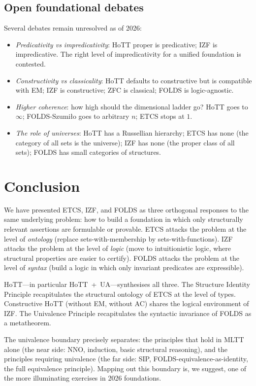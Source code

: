 \documentclass[12pt]{article}
\theoremstyle{definition}
\theoremstyle{remark}
\begin{document}
\subsection{Open foundational debates}

Several debates remain unresolved as of 2026:
\begin{itemize}
\item \emph{Predicativity vs impredicativity}: HoTT proper is predicative; IZF is
impredicative. The right level of impredicativity for a unified foundation is contested.
\item \emph{Constructivity vs classicality}: HoTT defaults to constructive but is
compatible with EM; IZF is constructive; ZFC is classical; FOLDS is logic-agnostic.
\item \emph{Higher coherence}: how high should the dimensional ladder go? HoTT goes to
$\infty$; FOLDS-Szumi\l{}o goes to arbitrary $n$; ETCS stops at $1$.
\item \emph{The role of universes}: HoTT has a Russellian hierarchy; ETCS has none
(the category of all sets is the universe); IZF has none (the proper class of all sets);
FOLDS has small categories of structures.
\end{itemize}

\section{Conclusion}
\label{sec:conclusion}

We have presented ETCS, IZF, and FOLDS as three orthogonal responses to the same
underlying problem: how to build a foundation in which only structurally relevant
assertions are formulable or provable. ETCS attacks the problem at the level of
\emph{ontology} (replace sets-with-membership by sets-with-functions). IZF attacks the
problem at the level of \emph{logic} (move to intuitionistic logic, where structural
properties are easier to certify). FOLDS attacks the problem at the level of
\emph{syntax} (build a logic in which only invariant predicates are expressible).

HoTT---in particular HoTT~+~UA---synthesises all three. The Structure Identity Principle
recapitulates the structural ontology of ETCS at the level of types. Constructive HoTT
(without EM, without AC) shares the logical environment of IZF. The Univalence Principle
recapitulates the syntactic invariance of FOLDS as a metatheorem.

The univalence boundary precisely separates: the principles that hold in MLTT alone
(the near side: NNO, induction, basic structural reasoning), and the principles requiring
univalence (the far side: SIP, FOLDS-equivalence-as-identity, the full equivalence
principle). Mapping out this boundary is, we suggest, one of the more illuminating
exercises in 2026 foundations.
\end{document}
